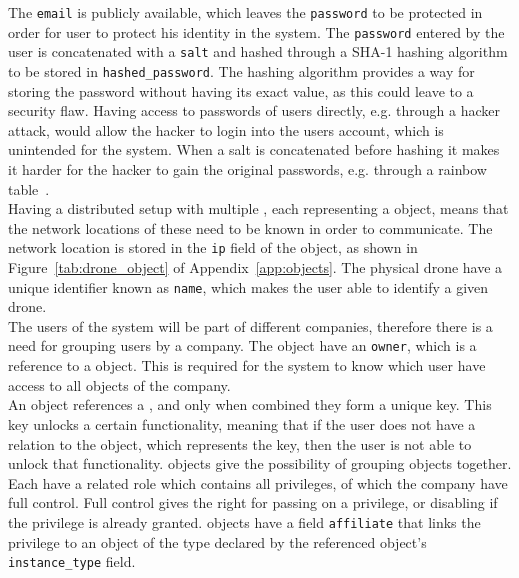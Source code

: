 The \verb+email+ is publicly available, which leaves the \verb+password+ to be protected in order for user to protect his identity in the system.
The \verb+password+ entered by the user is concatenated with a \verb+salt+ and hashed through a SHA-1 hashing algorithm to be stored in \verb+hashed_password+.
The hashing algorithm provides a way for storing the password without having its exact value, as this could leave to a security flaw.
Having access to passwords of users directly, e.g. through a hacker attack, would allow the hacker to login into the users account, which is unintended for the system.
When a salt is concatenated before hashing it makes it harder for the hacker to gain the original passwords, e.g. through a rainbow table~\cite{something}. \\

Having a distributed setup with multiple , each representing a  object, means that the network locations of these need to be known in order to communicate.
The network location is stored in the \verb+ip+ field of the  object, as shown in Figure~\ref{tab:drone_object} of Appendix~\ref{app:objects}.
The physical drone have a unique identifier known as \verb+name+, which makes the user able to identify a given drone. \\

The users of the system will be part of different companies, therefore there is a need for grouping users by a company.
The  object have an \verb+owner+, which is a reference to a  object.
This is required for the system to know which user have access to all  objects of the company. \\

An  object references a , and only when combined they form a unique key.
This key unlocks a certain functionality, meaning that if the user does not have a relation to the  object, which represents the key, then the user is not able to unlock that functionality.
 objects give the possibility of grouping  objects together.
Each  have a related role which contains all privileges, of which the company have full control.
Full control gives the right for passing on a privilege, or disabling if the privilege is already granted.
 objects have a field \verb+affiliate+ that links the privilege to an object of the type declared by the referenced  object's \verb+instance_type+ field. \\

